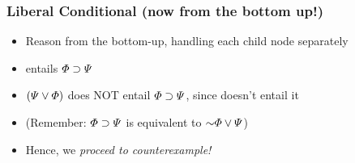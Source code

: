 \begin{frame}
\frametitle{Liberal Conditional (now from the bottom up!)}

\begin{itemize}[<+->]

\item Reason from the bottom-up, handling each child node separately 

\item \enot \metaA{} entails $\varPhi{}\supset\varPsi{}$

\item $(\varPsi{} \vee \varPhi{})$ does NOT entail $\varPhi{}\supset\varPsi{}$, since \metaA{} doesn't entail it


\item (Remember: $\varPhi{}\supset\varPsi{}$ is equivalent to $\enot \metaA{}\eor  \metaB{}$)

\item Hence, we \emph{proceed to counterexample!} 

%






\end{itemize}
\end{frame}

